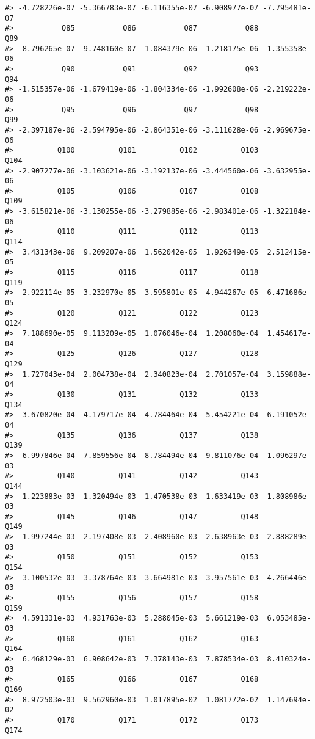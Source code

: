 \documentclass[]{article}
\begin{document}
\begin{verbatim}
#> -4.728226e-07 -5.366783e-07 -6.116355e-07 -6.908977e-07 -7.795481e-07 
#>           Q85           Q86           Q87           Q88           Q89 
#> -8.796265e-07 -9.748160e-07 -1.084379e-06 -1.218175e-06 -1.355358e-06 
#>           Q90           Q91           Q92           Q93           Q94 
#> -1.515357e-06 -1.679419e-06 -1.804334e-06 -1.992608e-06 -2.219222e-06 
#>           Q95           Q96           Q97           Q98           Q99 
#> -2.397187e-06 -2.594795e-06 -2.864351e-06 -3.111628e-06 -2.969675e-06 
#>          Q100          Q101          Q102          Q103          Q104 
#> -2.907277e-06 -3.103621e-06 -3.192137e-06 -3.444560e-06 -3.632955e-06 
#>          Q105          Q106          Q107          Q108          Q109 
#> -3.615821e-06 -3.130255e-06 -3.279885e-06 -2.983401e-06 -1.322184e-06 
#>          Q110          Q111          Q112          Q113          Q114 
#>  3.431343e-06  9.209207e-06  1.562042e-05  1.926349e-05  2.512415e-05 
#>          Q115          Q116          Q117          Q118          Q119 
#>  2.922114e-05  3.232970e-05  3.595801e-05  4.944267e-05  6.471686e-05 
#>          Q120          Q121          Q122          Q123          Q124 
#>  7.188690e-05  9.113209e-05  1.076046e-04  1.208060e-04  1.454617e-04 
#>          Q125          Q126          Q127          Q128          Q129 
#>  1.727043e-04  2.004738e-04  2.340823e-04  2.701057e-04  3.159888e-04 
#>          Q130          Q131          Q132          Q133          Q134 
#>  3.670820e-04  4.179717e-04  4.784464e-04  5.454221e-04  6.191052e-04 
#>          Q135          Q136          Q137          Q138          Q139 
#>  6.997846e-04  7.859556e-04  8.784494e-04  9.811076e-04  1.096297e-03 
#>          Q140          Q141          Q142          Q143          Q144 
#>  1.223883e-03  1.320494e-03  1.470538e-03  1.633419e-03  1.808986e-03 
#>          Q145          Q146          Q147          Q148          Q149 
#>  1.997244e-03  2.197408e-03  2.408960e-03  2.638963e-03  2.888289e-03 
#>          Q150          Q151          Q152          Q153          Q154 
#>  3.100532e-03  3.378764e-03  3.664981e-03  3.957561e-03  4.266446e-03 
#>          Q155          Q156          Q157          Q158          Q159 
#>  4.591331e-03  4.931763e-03  5.288045e-03  5.661219e-03  6.053485e-03 
#>          Q160          Q161          Q162          Q163          Q164 
#>  6.468129e-03  6.908642e-03  7.378143e-03  7.878534e-03  8.410324e-03 
#>          Q165          Q166          Q167          Q168          Q169 
#>  8.972503e-03  9.562960e-03  1.017895e-02  1.081772e-02  1.147694e-02 
#>          Q170          Q171          Q172          Q173          Q174 

\end{verbatim}
\end{document}
